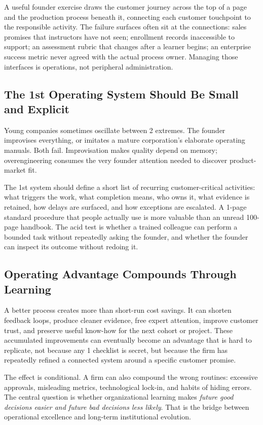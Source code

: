 A useful founder exercise draws the customer journey across the top of a page and the production process beneath it, connecting each customer touchpoint to the responsible activity. The failure surfaces often sit at the connections: sales promises that instructors have not seen; enrollment records inaccessible to support; an assessment rubric that changes after a learner begins; an enterprise success metric never agreed with the actual process owner. Managing those interfaces is operations, not peripheral administration.

\subsection{The 1st Operating System Should Be Small and Explicit}
\label{sec:first_operating_system}

Young companies sometimes oscillate between 2 extremes. The founder improvises everything, or imitates a mature corporation's elaborate operating manuals. Both fail. Improvisation makes quality depend on memory; overengineering consumes the very founder attention needed to discover product-market fit.

The 1st system should define a short list of recurring customer-critical activities: what triggers the work, what completion means, who owns it, what evidence is retained, how delays are surfaced, and how exceptions are escalated. A 1-page standard procedure that people actually use is more valuable than an unread 100-page handbook. The acid test is whether a trained colleague can perform a bounded task without repeatedly asking the founder, and whether the founder can inspect its outcome without redoing it.

\subsection{Operating Advantage Compounds Through Learning}
\label{sec:advantage_compounds}

A better process creates more than short-run cost savings. It can shorten feedback loops, produce cleaner evidence, free expert attention, improve customer trust, and preserve useful know-how for the next cohort or project. These accumulated improvements can eventually become an advantage that is hard to replicate, not because any 1 checklist is secret, but because the firm has repeatedly refined a connected system around a specific customer promise.

The effect is conditional. A firm can also compound the wrong routines: excessive approvals, misleading metrics, technological lock-in, and habits of hiding errors. The central question is whether organizational learning makes \textit{future good decisions easier and future bad decisions less likely}. That is the bridge between operational excellence and long-term institutional evolution.

